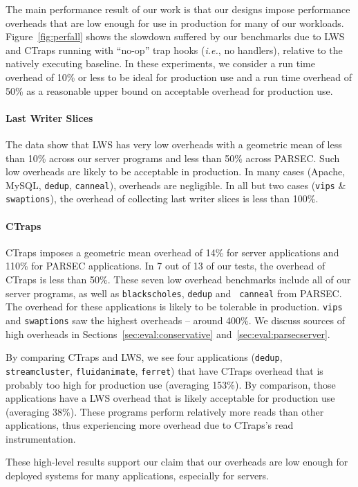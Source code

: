 \documentclass[10pt,nocopyrightspace]{sigplanconf}
\newcommand{\ctraps}{CTraps\xspace}
\newcommand{\lws}{LWS\xspace}
\begin{document}
The main performance result of our work is that our designs impose performance
overheads that are low enough for use in production for many of our
workloads.  Figure~\ref{fig:perfall} shows the slowdown suffered
by our benchmarks due to \lws and \ctraps running with ``no-op''
trap hooks ({\em i.e.}, no handlers), relative to the natively executing
baseline.  In these experiments, we consider a run time overhead of 10\% or
less to be ideal for production use and a run time overhead of 50\% as
a reasonable upper bound on acceptable overhead for production use.

\paragraph{Last Writer Slices}
The data show that \lws has very low overheads with a geometric
mean of less than 10\% across our server programs and less than 50\% across
PARSEC.  Such low overheads are likely to be acceptable in production.  In many
cases (Apache, MySQL, {\tt dedup}, {\tt canneal}), overheads are negligible.
In all but two cases ({\tt vips} \& {\tt swaptions}), the overhead of
collecting last writer slices is less than 100\%.    

\paragraph{\ctraps}
\ctraps imposes a geometric mean overhead of 14\% for server applications and
110\% for PARSEC applications.  In 7 out of 13 of our tests, the overhead of
\ctraps is less than 50\%.  These seven low overhead benchmarks include all of
our server programs, as well as {\tt blackscholes}, {\tt dedup} and {\tt
canneal} from PARSEC.  The overhead for these applications is likely to be
tolerable in production.  {\tt vips} and {\tt swaptions} saw the highest
overheads -- around 400\%.  We discuss sources of high overheads in
Sections~\ref{sec:eval:conservative} and~\ref{sec:eval:parsecserver}.

By comparing \ctraps and \lws, we see four applications ({\tt dedup}, {\tt
streamcluster}, {\tt fluidanimate}, {\tt ferret}) that have \ctraps overhead
that is probably too high for production use (averaging 153\%).  By comparison,
those applications have a \lws overhead that is likely acceptable for
production use (averaging 38\%).  These programs perform relatively more reads
than other applications, thus experiencing more overhead due to \ctraps's read
instrumentation.

These high-level results support our claim that our overheads 
are low enough for deployed systems for many applications, especially
for servers.  
\end{document}
